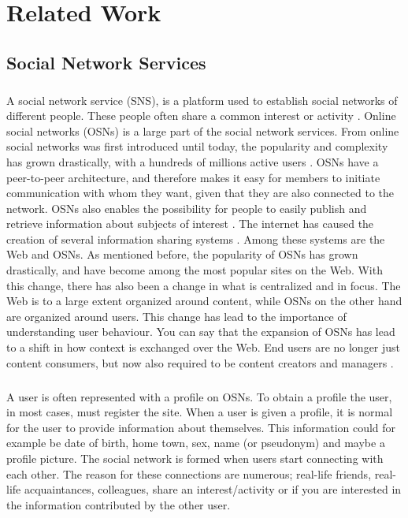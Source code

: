 \chapter{Related Work}
\label{chp:relatedwork} 


\section{Social Network Services}
\paragraph{}
A social network service (SNS), is a platform used to establish social networks of different people. These people often share a common interest or activity \cite{SNS}. Online social networks (OSNs) is a large part of the social network services. From online social networks was first introduced until today, the popularity and complexity has grown drastically, with a hundreds of millions active users \cite{OSN}. OSNs have a peer-to-peer architecture, and therefore makes it easy for members to initiate communication with whom they want, given that they are also connected to the network. OSNs also enables the possibility for people to easily publish and retrieve information about subjects of interest \cite{DPBook}. The internet has caused the creation of several information sharing systems \cite{OSNpaper}. Among these systems are the Web and OSNs. As mentioned before, the popularity of OSNs has grown drastically, and have become among the most popular sites on the Web. With this change, there has also been a change in what is centralized and in focus. The Web is to a large extent organized around content, while OSNs on the other hand are organized around users. This change has lead to the importance of understanding user behaviour. You can say that the expansion of OSNs has lead to a shift in how context is exchanged over the Web. End users are no longer just content consumers, but now also required to be content creators and managers \cite{expectations}.

\paragraph{}
A user is often represented with a profile on OSNs. To obtain a profile the user, in most cases, must register the site. When a user is given a profile, it is normal for the user to provide information about themselves. This information could for example be date of birth, home town, sex, name (or pseudonym) and maybe a profile picture. The social network is formed when users start connecting with each other. The reason for these connections are numerous; real-life friends, real-life acquaintances, colleagues, share an interest/activity or if you are interested in the information contributed by the other user. 


